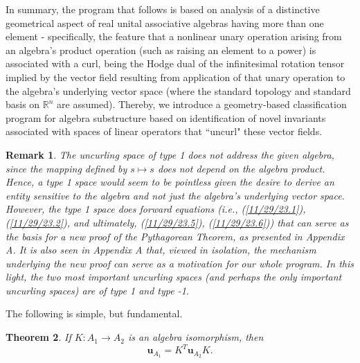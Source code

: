 \documentclass{amsart}
\numberwithin{equation}{section}
\newtheorem{theorem}{Theorem}
\newtheorem{remark}[theorem]{Remark}
\theoremstyle{definition}
\numberwithin{theorem}{section}
\begin{document}
         In summary, the program that follows is based on analysis of a distinctive geometrical aspect of real unital associative algebras having more than one element  - specifically, the feature that a nonlinear unary operation arising from an algebra's product operation (such as raising an element to a power) is associated with a curl, being the Hodge dual of the infinitesimal rotation tensor implied by the vector field resulting from application of that unary operation to the algebra's underlying vector space (where the standard topology and standard basis on $\mathbb{R}^n$ are assumed).   Thereby, we introduce a geometry-based classification program for algebra substructure based on identification of novel invariants associated with spaces of linear operators that ``uncurl" these vector fields.        

\begin{remark}\label{11/21/23.1} {\rm The uncurling space of type 1 does not address the given algebra, since the mapping defined by $s\mapsto s$ does not depend on the algebra product.  Hence, a type 1 space would seem to be pointless given the desire to derive an entity sensitive to the algebra and not just the algebra's underlying vector space.  However, the type 1 space does forward equations (i.e., (\ref{11/29/23.1}), (\ref{11/29/23.2}), and ultimately, (\ref{11/29/23.5}), (\ref{11/29/23.6})) that can serve as the basis for a new proof of the Pythagorean Theorem, as presented in Appendix A.  It is also seen in Appendix A that, viewed in isolation, the mechanism underlying the new proof can serve as a motivation for our whole program.  In this light, the two most important uncurling spaces (and perhaps the only important uncurling spaces) are of type 1 and type -1.}\end{remark}

\newpage

The following is simple, but fundamental.


\begin{theorem} \label{6/6/23.1} If $K:A_1\rightarrow A_2$ is an algebra isomorphism, then \begin{equation}\label{5/23/23.1} \mathbf{u}_{A_1} = K^T \mathbf{u}_{A_2} K. \end{equation} \end{theorem}
\end{document}
